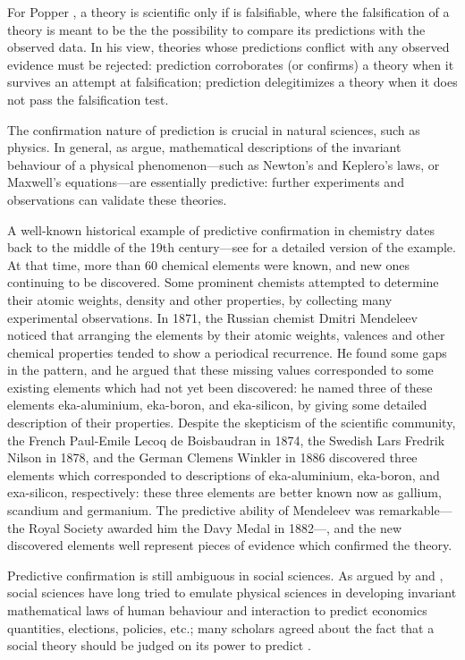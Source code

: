 \documentclass{statsoc}
\begin{document}
For Popper \citep{popper2005logic}, a theory is scientific only if is falsifiable, where the falsification of a theory is meant to be the the possibility to compare its predictions 
with the observed data. In his view, theories whose predictions conflict with any observed evidence must be rejected: prediction corroborates (or confirms) a theory when it survives 
an attempt at falsification; prediction delegitimizes a theory when it does not pass the falsification test.

The confirmation nature of prediction is crucial in natural sciences, such as physics. In general,  as \cite{hitchcock2004prediction} argue,   mathematical descriptions of the 
invariant behaviour of a physical phenomenon---such as Newton's and Keplero's laws, or Maxwell's equations---are essentially predictive: further experiments and observations can validate these theories. 

A well-known historical example of predictive confirmation in chemistry dates back to the middle of the 19th century---see \cite{maher1988prediction} for a detailed version of the 
example. At that time, more than 60 chemical elements were known, and new ones continuing to be discovered. Some prominent chemists attempted to determine their atomic weights, 
density and other properties, by collecting many experimental observations. In 1871, the Russian chemist Dmitri Mendeleev noticed that arranging the elements by their atomic 
weights, valences and other chemical properties tended to show a periodical recurrence. He found some gaps in the pattern, and he argued that these missing values corresponded to 
some existing elements which had not yet been discovered: he named three of these elements eka-aluminium, eka-boron, and eka-silicon, by giving some detailed description of their 
properties. Despite the skepticism of the scientific community, the French Paul-Emile Lecoq de Boisbaudran in 1874, the Swedish Lars Fredrik Nilson in 1878, and the German Clemens 
Winkler in 1886 discovered three elements which corresponded to descriptions of eka-aluminium, eka-boron, and exa-silicon, respectively: these three elements are better known 
now as gallium, scandium and germanium. The predictive ability of Mendeleev was remarkable---the Royal Society awarded him the Davy Medal in 1882---, and the new discovered elements well represent pieces of evidence which confirmed the theory.

Predictive confirmation is still ambiguous in social sciences. As argued by \citep{popper1944poverty, popper1945poverty} and \cite{sarewitz1999prediction}, social sciences 
have long tried to emulate physical sciences in developing invariant mathematical laws of human behaviour and interaction to predict economics quantities, elections, policies, etc.; 
many scholars agreed about the fact that a social theory should be judged on its power to predict \citep{friedman1953essays}. 
\end{document}
